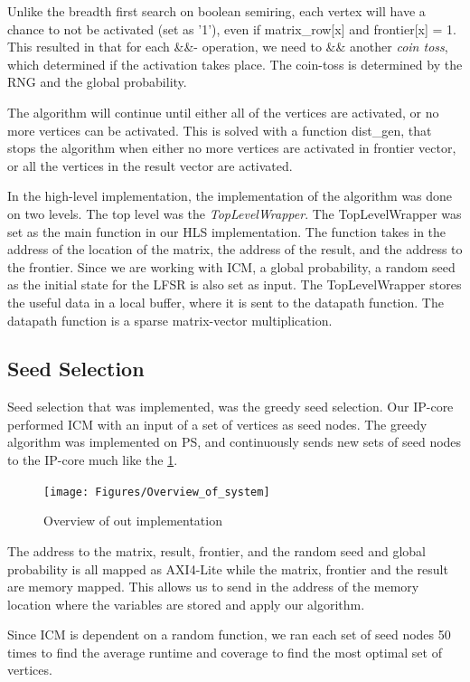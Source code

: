 Unlike the breadth first search on boolean semiring, each vertex will have a chance to not be activated (set as '1'), even if matrix\_row[x] and frontier[x] = 1. This resulted in that for each \&\&- operation, we need to \&\& another \textit{coin toss}, which determined if the activation takes place. The coin-toss is determined by the RNG and the global probability. 

The algorithm will continue until either all of the vertices are activated, or no more vertices can be activated. This is solved with a function dist\_gen, that stops the algorithm when either no more vertices are activated in frontier vector, or all the vertices in the result vector are activated. 

In the high-level implementation, the implementation of the algorithm was done on two levels. The top level was the \textit{TopLevelWrapper}. The TopLevelWrapper was set as the main function in our HLS implementation. The function takes in the address of the location of the matrix, the address of the result, and the address to the frontier. Since we are working with ICM, a global probability, a random seed as the initial state for the LFSR is also set as input. The  TopLevelWrapper stores the useful data in a local buffer, where it is sent to the datapath function. The datapath function is a sparse matrix-vector multiplication. 

\subsection{Seed Selection}
Seed selection that was implemented, was the greedy seed selection. Our IP-core performed ICM with an input of a set of vertices as seed nodes. The greedy algorithm was implemented on PS, and continuously sends new sets of seed nodes to the IP-core much like the \ref{fig:overviewe}. 


\begin{figure}[!]
\texttt{[image: Figures/Overview\_of\_system]}
\caption{Overview of out implementation}
    \label{fig:overviewe}
\end{figure}


The address to the matrix, result, frontier, and the random seed and global probability is all mapped as AXI4-Lite while the matrix, frontier and the result are memory mapped. This allows us to send in the address of the memory location where the variables are stored and apply our algorithm. 
 
Since ICM is dependent on a random function, we ran each set of seed nodes 50 times to find the average runtime and coverage to find the most optimal set of vertices.

